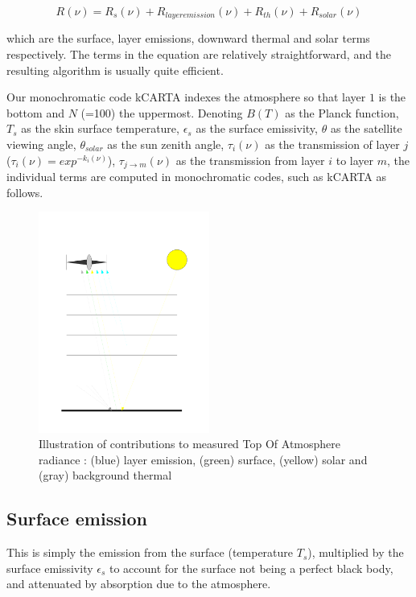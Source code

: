 \documentclass[11pt]{article}
\newcommand{\kc}{\textsf{kCARTA}\xspace}
\begin{document}
\begin{equation}
R(\nu) = R_{s}(\nu) + R_{layer emission}(\nu) + R_{th}(\nu) + R_{solar}(\nu)
\label{eqn:sch_detail}
\end{equation}

which are the surface, layer emissions, downward thermal and solar terms
respectively. The terms in the equation are relatively straightforward, and the resulting algorithm is 
usually quite efficient. 

Our monochromatic code \kc indexes the atmosphere so that layer $1$ is the bottom and
$N$ (=100) the uppermost. Denoting $B(T)$ as the Planck function, $T_{s}$ as
the skin surface temperature, $\epsilon_{s}$ as the surface emissivity,
$\theta$ as the satellite viewing angle, $\theta_{solar}$ as the sun zenith
angle, $\tau_{i}(\nu)$ as the transmission of layer $j$
($\tau_{i}(\nu) = exp^{-k_{i}(\nu)}$), $\tau_{j \rightarrow m}(\nu)$ as the
transmission from layer $i$ to layer $m$, the individual terms are computed in
monochromatic codes, such as \kc as follows.

\begin{figure}
\centering
\includegraphics[width=0.5\textwidth]{Figs/radiation1.pdf}
\caption{Illustration of contributions to measured Top Of Atmosphere radiance :
 (blue) layer emission, (green) surface, (yellow) solar and (gray) background thermal}
\end{figure}

\subsection{Surface emission}

This is simply the emission from the surface (temperature $T_{s}$),
multiplied by the surface emissivity $\epsilon_{s}$ to account for the surface
not being a perfect black body, and attenuated by absorption due to the
atmosphere.
\end{document}
